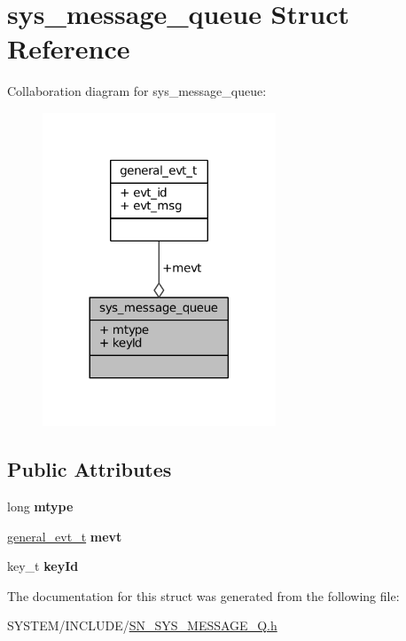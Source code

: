 \hypertarget{structsys__message__queue}{}\section{sys\+\_\+message\+\_\+queue Struct Reference}
\label{structsys__message__queue}


Collaboration diagram for sys\+\_\+message\+\_\+queue\+:\nopagebreak
\begin{figure}[H]
\begin{center}
\leavevmode
\includegraphics[width=197pt]{structsys__message__queue__coll__graph}
\end{center}
\end{figure}
\subsection*{Public Attributes}
\begin{DoxyCompactItemize}
\item 
\mbox{\label{structsys__message__queue_a9b2539ad04839983cc871b10adee6c35}} 
long {\bfseries mtype}
\item 
\mbox{\label{structsys__message__queue_a7da65ae9727739292cc25855477d6b4e}} 
\hyperlink{structgeneral__evt__t}{general\+\_\+evt\+\_\+t} {\bfseries mevt}
\item 
\mbox{\label{structsys__message__queue_ac6b6479c4b7f7610cb17b3288ce2761b}} 
key\+\_\+t {\bfseries key\+Id}
\end{DoxyCompactItemize}


The documentation for this struct was generated from the following file\+:\begin{DoxyCompactItemize}
\item 
S\+Y\+S\+T\+E\+M/\+I\+N\+C\+L\+U\+D\+E/\hyperlink{SN__SYS__MESSAGE__Q_8h}{S\+N\+\_\+\+S\+Y\+S\+\_\+\+M\+E\+S\+S\+A\+G\+E\+\_\+\+Q.\+h}\end{DoxyCompactItemize}

